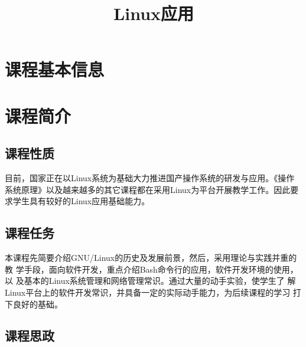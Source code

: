\documentclass{swfusyllabus}
\title{Linux应用}
\begin{document}
\maketitle{}

\section{课程基本信息}

\basicinfo{}

\section{课程简介}

\subsection{课程性质}

目前，国家正在以Linux系统为基础大力推进国产操作系统的研发与应用。《操作
系统原理》以及越来越多的其它课程都在采用Linux为平台开展教学工作。因此要
求学生具有较好的Linux应用基础能力。

\subsection{课程任务}




本课程先简要介绍GNU/Linux的历史及发展前景，然后，采用理论与实践并重的教
学手段，面向软件开发，重点介绍Bash命令行的应用，软件开发环境的使用，以
及基本的Linux系统管理和网络管理常识。通过大量的动手实验，使学生了
解Linux平台上的软件开发常识，并具备一定的实际动手能力，为后续课程的学习
打下良好的基础。

\subsection{课程思政}
\end{document}
